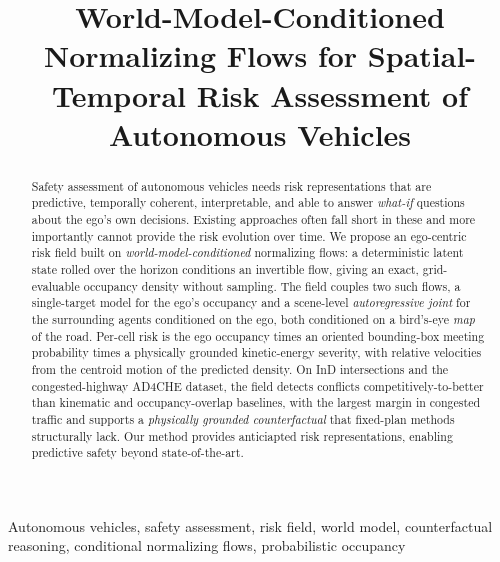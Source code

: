 \documentclass[journal]{IEEEtran}
\begin{document}


\title{World-Model-Conditioned Normalizing Flows for Spatial-Temporal Risk Assessment of Autonomous Vehicles}
\author{
}

\maketitle

\begin{abstract}
Safety assessment of autonomous vehicles needs risk representations that are predictive, temporally coherent, interpretable, and able to answer \emph{what-if} questions about the ego's own decisions. Existing approaches often fall short in these and more importantly cannot provide the risk evolution over time. We propose an ego-centric risk field built on \emph{world-model-conditioned} normalizing flows: a deterministic latent state rolled over the horizon conditions an invertible flow, giving an exact, grid-evaluable occupancy density without sampling. The field couples two such flows, a single-target model for the ego's occupancy and a scene-level \emph{autoregressive joint} for the surrounding agents conditioned on the ego, both conditioned on a bird's-eye \emph{map} of the road. Per-cell risk is the ego occupancy times an oriented bounding-box meeting probability times a physically grounded kinetic-energy severity, with relative velocities from the centroid motion of the predicted density. On InD intersections and the congested-highway AD4CHE dataset, the field detects conflicts competitively-to-better than kinematic and occupancy-overlap baselines, with the largest margin in congested traffic and supports a \emph{physically grounded counterfactual} that fixed-plan methods structurally lack. Our method provides anticiapted risk representations, enabling predictive safety beyond state-of-the-art.
\end{abstract}

\begin{IEEEkeywords}
Autonomous vehicles, safety assessment, risk field, world model, counterfactual reasoning, conditional normalizing flows, probabilistic occupancy
\end{IEEEkeywords}
\end{document}
